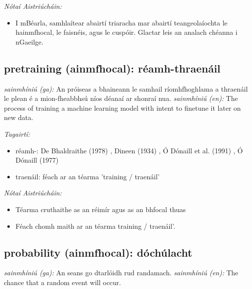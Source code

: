 \documentclass{article}
\begin{document}
 \noindent \textit{Nótaí Aistriúcháin:}
\begin{itemize}
	\item I mBéarla, samhlaítear abairtí triaracha mar abairtí teangeolaíochta le hainmfhocal, le faisnéis, agus le cuspóir. Glactar leis an analach chéanna i nGaeilge.
\end{itemize}


\subsection*{pretraining (ainmfhocal): réamh-thraenáil} 
 \noindent \textit{sainmhíniú (ga):} An próiseas a bhaineann le samhail ríomhfhoghlama a thraenáil le plean é a mion-fheabbhsú níos déanaí ar shonraí nua.
\newline\newline
 \noindent \textit{sainmhíniú (en):} The process of training a machine learning model with intent to finetune it later on new data.
\newline

 \noindent \textit{Tagairtí:}
\begin{itemize}
	\item réamh-: De Bhaldraithe (1978) \cite{de-bhaldraithe}, Dineen (1934) \cite{dineen}, Ó Dónaill et al. (1991) \cite{focloir-beag}, Ó Dónaill (1977) \cite{odonaill}
	\item traenáil: féach ar an téarma 'training / traenáil'
\end{itemize}

 \noindent \textit{Nótaí Aistriúcháin:}
\begin{itemize}
	\item Téarma cruthaithe as an réimír agus as an bhfocal thuas
	\item Féach chomh maith ar an téarma training / traenáil'.
\end{itemize}


\subsection*{probability (ainmfhocal): dóchúlacht} 
 \noindent \textit{sainmhíniú (ga):} An seans go dtarlóidh rud randamach.
\newline\newline
 \noindent \textit{sainmhíniú (en):} The chance that a random event will occur.
\newline
\end{document}
